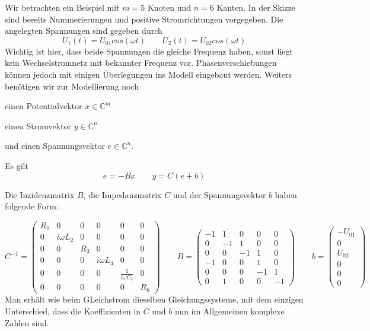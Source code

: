 \documentclass[11pt,titlepage]{article}
\begin{document}
		Wir betrachten ein Beispiel mit $m=5$ Knoten und $n=6$ Kanten. In der Skizze sind bereits Nummerierungen und positive Stromrichtungen vorgegeben. Die angelegten Spannungen sind gegeben durch
		\begin{displaymath}
			U_1(t) = U_{01} cos(\omega t) \qquad
			U_2(t) = U_{02} cos(\omega t)
		\end{displaymath}
		Wichtig ist hier, dass beide Spannungen die gleiche Frequenz haben, sonst liegt kein Wechselstromnetz mit bekannter Frequenz vor. Phasenverschiebungen können jedoch mit einigen Überlegungen ins Modell eingebaut werden.
		Weiters benötigen wir zur Modellierung noch
		\begin{description}
			\item einen Potentialvektor $x \in \mathbb{C}^{m}$
			\item einen Stromvektor $y \in \mathbb{C}^{n}$
			\item und einen Spannungsvektor $e \in \mathbb{C}^n$.
		\end{description}
		Es gilt
		\begin{displaymath}
			e = -Bx \qquad
			y = C(e+b)
		\end{displaymath}
		
		Die Inzidenzmatrix $B$, die Impedanzmatrix $C$ und der Spannungsvektor $b$ haben folgende Form:
		
		\begin{displaymath}
			C^{-1}=
			\begin{pmatrix}
				R_1 & 0 & 0 & 0 & 0 & 0 \\
				0 & i \omega L_2 & 0 & 0 & 0 & 0 \\
				0 & 0 & R_3 & 0 & 0 & 0 \\
				0 & 0 & 0 & i \omega L_4 & 0 & 0 \\
				0 & 0 & 0 & 0 & \frac{1}{i \omega C_5} & 0 \\
				0 & 0 & 0 & 0 & 0 & R_6
			\end{pmatrix}
			\qquad
			B=
			\begin{pmatrix}
				-1 & 1 & 0 & 0 & 0 \\
				0 & -1 & 1 & 0 & 0 \\
				0 & 0 & -1 & 1 & 0 \\
				-1 & 0 & 0 & 1 & 0 \\
				0 & 0 & 0 & -1 & 1 \\
				0 & 1 & 0 & 0 & -1
			\end{pmatrix}
			\qquad
			b=
			\begin{pmatrix}
				-U_{01} \\
				0 \\
				U_{02}\\
				0 \\
				0 \\
				0
			\end{pmatrix}	
		\end{displaymath}
		Man erhält wie beim GLeichstrom dieselben Gleichungssysteme, mit dem einzigen Unterschied, dass die Koeffizienten in $C$ und $b$ nun im Allgemeinen komplexe Zahlen sind.
		
\end{document}
